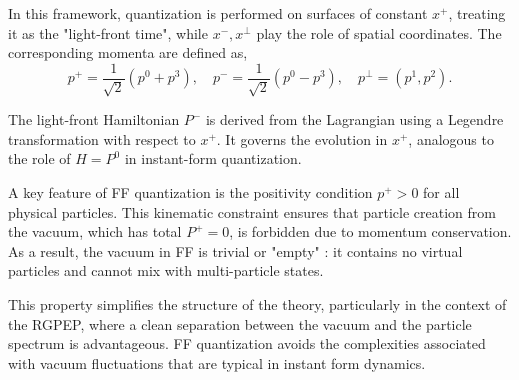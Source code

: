 \documentclass[11pt,a4paper,twoside,pdf]{article}
\numberwithin{equation}{section}
\begin{document}
In this framework, quantization is performed on surfaces of constant \( x^+ \), 
treating it as the "light-front time", while \( x^-, x^\perp \) play the role 
of spatial coordinates. The corresponding momenta are defined as,
\begin{equation}
    p^+ = \frac{1}{\sqrt{2}} (p^0 + p^3), \quad
    p^- = \frac{1}{\sqrt{2}} (p^0 - p^3), \quad
    p^\perp = (p^1, p^2).
\end{equation}

The light-front Hamiltonian \( P^- \) is derived from the Lagrangian using 
a Legendre transformation with respect to \( x^+ \). It governs the evolution 
in \( x^+ \), analogous to the role of \( H = P^0 \) in instant-form quantization.

A key feature of FF quantization is the positivity condition \( p^+ > 0 \) 
for all physical particles. This kinematic constraint ensures that particle 
creation from the vacuum, which has total \( P^+ = 0 \), is forbidden due to 
momentum conservation. As a result, the vacuum in FF is trivial or "empty" \cite{Brodsky_1998}: 
it contains no virtual particles and cannot mix with multi-particle states.

This property simplifies the structure of the theory, particularly in the 
context of the RGPEP, where a clean separation between the vacuum and 
the particle spectrum is advantageous. FF quantization avoids the 
complexities associated with vacuum fluctuations that are typical in 
instant form dynamics.
\end{document}
